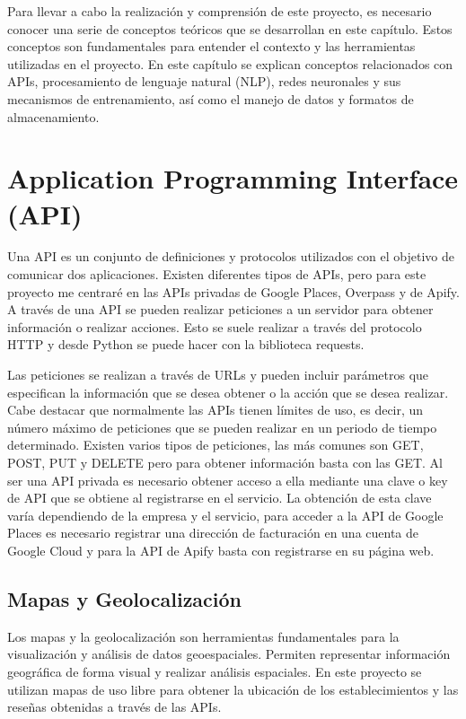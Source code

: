 
Para llevar a cabo la realización y comprensión de este proyecto, es necesario conocer una serie de conceptos teóricos que se desarrollan en este capítulo. Estos conceptos son fundamentales para entender el contexto y las herramientas utilizadas en el proyecto.
En este capítulo se explican conceptos relacionados con APIs, procesamiento de lenguaje natural (NLP), redes neuronales y sus mecanismos de entrenamiento, así como el manejo de datos y formatos de almacenamiento.

\section{Application Programming Interface (API)}

Una API es un conjunto de definiciones y protocolos utilizados con el objetivo de comunicar dos aplicaciones. \cite{xataka:api}
Existen diferentes tipos de APIs, pero para este proyecto me centraré en las APIs privadas de Google Places, Overpass y de Apify.
A través de una API se pueden realizar peticiones a un servidor para obtener información o realizar acciones. Esto se suele realizar a través del protocolo HTTP y desde Python se puede hacer con la biblioteca requests.

Las peticiones se realizan a través de URLs y pueden incluir parámetros que especifican la información que se desea obtener o la acción que se desea realizar.
Cabe destacar que normalmente las APIs tienen límites de uso, es decir, un número máximo de peticiones que se pueden realizar en un periodo de tiempo determinado.
Existen varios tipos de peticiones, las más comunes son GET, POST, PUT y DELETE pero para obtener información basta con las GET.
Al ser una API privada es necesario obtener acceso a ella mediante una clave o key de API que se obtiene al registrarse en el servicio.
La obtención de esta clave varía dependiendo de la empresa y el servicio, para acceder a la API de Google Places es necesario registrar una dirección de facturación en una cuenta de Google Cloud y para la API de Apify basta con registrarse en su página web.


\subsection{Mapas y Geolocalización}

Los mapas y la geolocalización son herramientas fundamentales para la visualización y análisis de datos geoespaciales.
Permiten representar información geográfica de forma visual y realizar análisis espaciales.
En este proyecto se utilizan mapas de uso libre para obtener la ubicación de los establecimientos y las reseñas obtenidas a través de las APIs.

